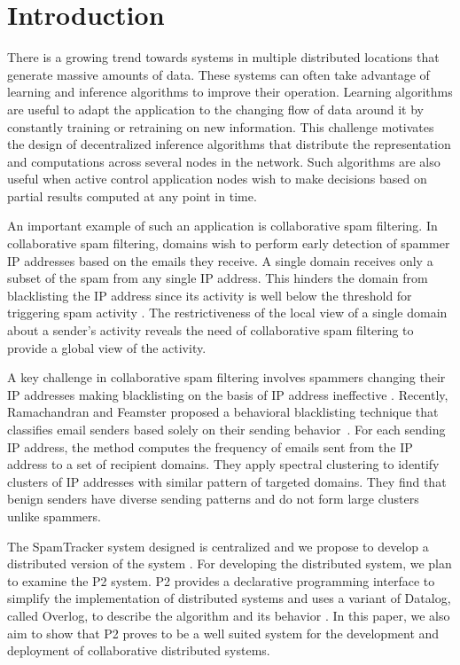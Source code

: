 \section{Introduction}
\label{INTRO}
There is a growing trend towards systems in multiple distributed locations that generate massive amounts of data. These systems can often take advantage of learning and inference algorithms to improve their operation. Learning algorithms are useful to adapt the application to the changing flow of data around it by constantly training or retraining on new information. This challenge motivates the design of decentralized inference algorithms that distribute the representation and computations across several nodes in the network. Such algorithms are also useful when active control application nodes wish to make decisions based on partial results computed at any point in time. 

An important example of such an application is collaborative spam filtering. In collaborative spam filtering, domains wish to perform early detection of spammer IP addresses based on the emails they receive. A single domain receives only a subset of the spam from any single IP address. This hinders the domain from blacklisting the IP address since its activity is well below the threshold for triggering spam activity \cite{sb}. The restrictiveness of the local view of a single domain about a sender's activity reveals the need of collaborative spam filtering to provide a global view of the activity. 

A key challenge in collaborative spam filtering involves spammers changing their IP addresses making blacklisting on the basis of IP address ineffective \cite{sb}. Recently, Ramachandran and Feamster proposed a behavioral blacklisting technique that classifies email senders based solely on their sending behavior~\cite{bb}. For each sending IP address, the method computes the frequency of emails sent from the IP address to a set of recipient domains. They apply spectral clustering to identify clusters of IP addresses with similar pattern of targeted domains. They find that benign senders have diverse sending patterns and do not form large clusters unlike spammers. 

The SpamTracker system designed is centralized and we propose to develop a distributed version of the system \cite{bb}. For developing the distributed system, we plan to examine the P2 system. P2 provides a declarative programming interface to simplify the implementation of distributed systems and uses a variant of Datalog, called Overlog, to describe the algorithm and its behavior \cite{ndlog}. In this paper, we also aim to show that P2 proves to be a well suited system for the development and deployment of collaborative distributed systems.

